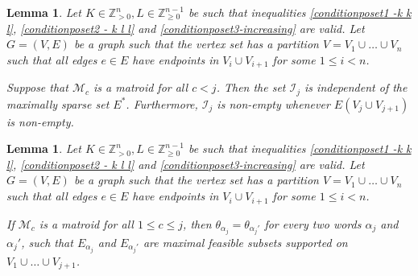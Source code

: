 \documentclass[10pt,a4paper]{article}
\newtheorem{lemma}[theorem]{Lemma}
\begin{document}
\begin{lemma}\label{Matroid_1}
Let $K\in \mathbb{Z}_{>0}^{n}, L\in \mathbb{Z}_{\geq 0}^{n-1}$ be such that inequalities \eqref{conditionposet1 -k k l}, \eqref{conditionposet2 - k l l} and \eqref{conditionposet3-increasing} are valid. Let $G=(V,E)$ be a graph such that the vertex set has a partition $V=V_1\cup \dots \cup V_n$ such that all edges $e\in E$ have endpoints in $V_{i} \cup V_{i+1}$ for some $1 \leq i < n$.

Suppose that $\mathcal{M}_c$ is a matroid for all $c < j$. Then the set $\mathcal{I}_{j}$ is independent of the maximally sparse set $E^*$. Furthermore, $\mathcal{I}_j$ is non-empty whenever $E(V_{j} \cup V_{j+1})$ is non-empty.
\end{lemma}

\begin{lemma}
    Let $K\in \mathbb{Z}_{>0}^{n}, L\in \mathbb{Z}_{\geq 0}^{n-1}$ be such that inequalities \eqref{conditionposet1 -k k l}, \eqref{conditionposet2 - k l l} and \eqref{conditionposet3-increasing} are valid. Let $G=(V,E)$ be a graph such that the vertex set has a partition $V=V_1\cup \dots \cup V_n$ such that all edges $e\in E$ have endpoints in $V_{i} \cup V_{i+1}$ for some $1 \leq i < n$. 
    
    If $\mathcal{M}_c$ is a matroid for all $1 \leq c\leq j$, then $\theta_{\alpha_j} = \theta_{\alpha_j'}$ for every two words $\alpha_j$ and $\alpha_j'$, such that $E_{\alpha_j}$ and $E_{\alpha_j'}$ are maximal feasible subsets supported on $V_1\cup \dots \cup V_{j+1}$. 
    \label{surplus-independent}
\end{lemma}
\end{document}
